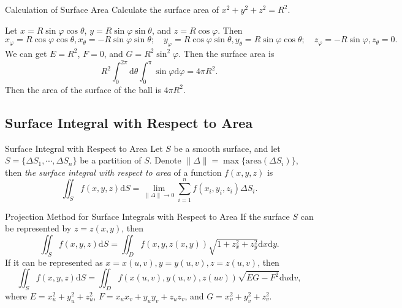 \begin{example}{Calculation of Surface Area}{}
  Calculate the surface area of $x^2 + y^2 + z^2 = R^2$.
\end{example}

\begin{solution}
  Let $x = R\sin\varphi \cos \theta$, $y = R \sin \varphi \sin \theta$,
  and $z = R \cos \varphi$.
  Then
  \begin{equation}
    x_{\varphi} = R \cos \varphi \cos \theta, x_{\theta} = -R \sin \varphi \sin \theta; \quad
    y_{\varphi} = R \cos \varphi \sin \theta, y_{\theta} = R \sin \varphi \cos \theta; \quad
    z_{\varphi} = -R\sin \varphi, z_{\theta} = 0.
  \end{equation}
  We can get $E = R^2$, $F = 0$, and $G = R^2 \sin^2 \varphi$.
  Then the surface area is
  \begin{equation}
    R^2\int_0^{2\pi}\mathrm{d} \theta \int_0^{\pi} \sin \varphi \mathrm{d} \varphi
    = 4\pi R^2.
  \end{equation}
  Then the area of the surface of the ball is $4\pi R^2$.
\end{solution}

\subsection{Surface Integral with Respect to Area}

\begin{definition}{Surface Integral with Respect to Area}{}
  Let $S$ be a smooth surface,
  and let $S = \{\Delta S_1, \cdots, \Delta S_n\}$ be a partition of $S$.
  Denote $\|\Delta\| = \max \{\text{area}(\Delta S_i)\}$,
  then \emph{the surface integral with respect to area} of a function $f(x, y, z)$ is
  \begin{equation}
    \iint_S f(x,y,z)\mathrm{d}S = \lim \limits _{\|\Delta\| \rightarrow 0}
    \sum\limits_{i = 1}^n f(x_i, y_i, z_i) \Delta S_i.
  \end{equation}
\end{definition}

\begin{proposition}{Projection Method for Surface Integrals with Respect to Area}{}
  If the surface $S$ can be represented by $z = z(x, y)$, then
  \begin{equation}
    \iint_S f(x,y,z)\mathrm{d}S = \iint_D f(x,y,z(x,y)) \sqrt{1 + z_x^2 + z_y^2}\mathrm{d} x \mathrm{d} y.
  \end{equation}
  If it can be represented as $x = x(u, v), y = y(u, v), z = z(u, v)$, then
  \begin{equation}
    \iint_S f(x,y,z)\mathrm{d}S = \iint_D f(x(u,v),y(u,v),z(uv)) \sqrt{EG-F^2}\mathrm{d} u \mathrm{d} v,
  \end{equation}
  where $E = x_u^2 + y_u^2 + z_u^2$, $F = x_ux_v + y_uy_v + z_uz_v$,
  and $G = x_v^2 + y_v^2 + z_v^2$.
\end{proposition}

